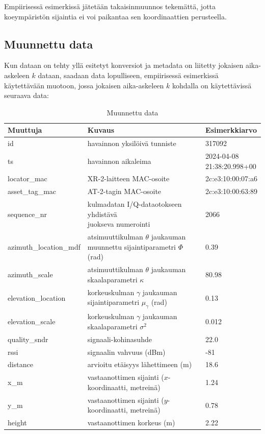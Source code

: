 \documentclass[
  12pt,
  a4paper, twoside]{book}
\begin{document}
\noindent Empiirisessä esimerkissä jätetään takaisinmuunnos tekemättä, jotta koeympäristön sijaintia ei voi paikantaa sen koordinaattien perusteella.

\subsection{Muunnettu data} \label{muunnettu-data-luku}

Kun dataan on tehty yllä esitetyt konversiot ja metadata on liitetty jokaisen aika-askeleen \(k\) dataan, saadaan data lopulliseen, empiirisessä esimerkissä käytettävään muotoon, jossa jokaisen aika-askeleen \(k\) kohdalla on käytettävissä seuraava data:

\def\arraystretch{1.25} 
\begin{table}[H]
\centering
\begin{tabular}{|l|l|l|}
\hline
Muuttuja & Kuvaus & Esimerkkiarvo\\
\hline
id & havainnon yksilöivä tunniste & 317092 \\
ts & havainnon aikaleima & \makecell[l]{2024-04-08 \\ 21:38:20.998+00}\\
locator\_mac & XR-2-laitteen MAC-osoite & 2c:e3:10:00:07:a6
\\
asset\_tag\_mac & AT-2-tagin MAC-osoite & 2c:e3:10:00:63:89\\
sequence\_nr & \makecell[l]{kulmadatan I/Q-dataotokseen yhdistävä \\ juokseva numerointi} & 2066\\
azimuth\_location\_mdf & \makecell[l]{atsimuuttikulman $\theta$ \\ jaukauman muunnettu sijaintiparametri \\ $\Phi$ (rad)} & 0.39
\\
azimuth\_scale & \makecell[l]{atsimuuttikulman $\theta$ \\ jaukauman skaalaparametri $\kappa$} & 80.98
\\
elevation\_location & \makecell[l]{korkeuskulman $\gamma$ \\ jaukauman sijaintiparametri $\mu_{\gamma}$ (rad)} & 0.13
\\
elevation\_scale & \makecell[l]{korkeuskulman $\gamma$ \\ jaukauman skaalaparametri $\sigma^2$} & 0.012
\\
quality\_sndr & signaali-kohinasuhde & 22.0 \\
rssi & signaalin vahvuus (dBm) & -81\\
distance & arvioitu etäisyys lähettimeen (m) & 18.6\\
x\_m & \makecell[l]{vastaanottimen sijainti \\ ($x$-koordinaatti, metreinä)} & 1.24\\
y\_m & \makecell[l]{vastaanottimen sijainti \\ ($y$-koordinaatti, metreinä)} & 0.78\\
height & vastaanottimen korkeus (m) & 2.22 \\
\hline
\end{tabular}
\caption{Muunnettu data}
\label{tab:muunnettu-data}
\end{table}
\end{document}
